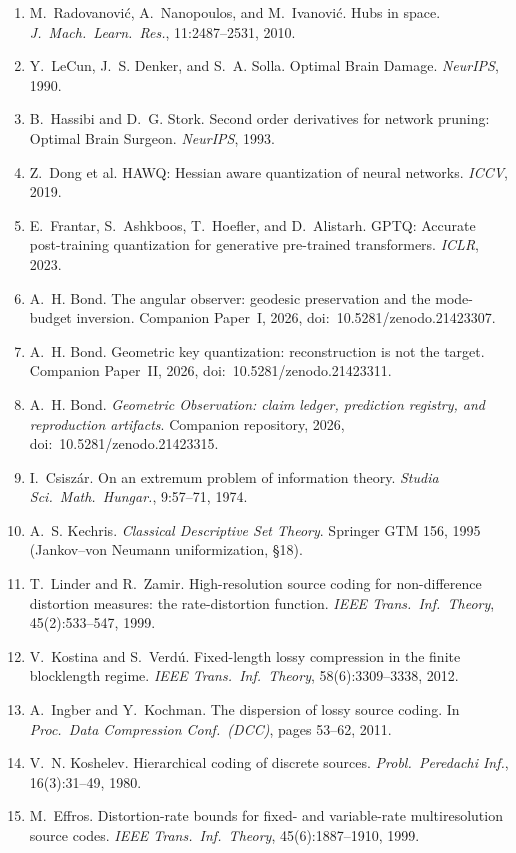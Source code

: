 \documentclass[lettersize,onecolumn]{IEEEtran}
\theoremstyle{definition}
\theoremstyle{remark}
\begin{document}
\begin{enumerate}
\item  M.~Radovanovi\'c, A.~Nanopoulos, and M.~Ivanovi\'c. Hubs in
space. \emph{J.\ Mach.\ Learn.\ Res.}, 11:2487--2531, 2010.
\item  Y.~LeCun, J.~S. Denker, and S.~A. Solla. Optimal Brain Damage.
\emph{NeurIPS}, 1990.
\item  B.~Hassibi and D.~G. Stork. Second order derivatives for
network pruning: Optimal Brain Surgeon. \emph{NeurIPS}, 1993.
\item  Z.~Dong et al. HAWQ: Hessian aware quantization of neural
networks. \emph{ICCV}, 2019.
\item  E.~Frantar, S.~Ashkboos, T.~Hoefler, and D.~Alistarh.
GPTQ: Accurate post-training quantization for generative pre-trained transformers.
\emph{ICLR}, 2023.
\item  A.~H. Bond. The angular observer: geodesic preservation and the
mode-budget inversion. Companion Paper~I, 2026, doi:~10.5281/zenodo.21423307.
\item  A.~H. Bond. Geometric key quantization: reconstruction is not the
target. Companion Paper~II, 2026, doi:~10.5281/zenodo.21423311.
\item  A.~H. Bond. \emph{Geometric Observation: claim ledger,
prediction registry, and reproduction artifacts}. Companion repository, 2026, doi:~10.5281/zenodo.21423315.
\item  I.~Csisz\'ar. On an extremum problem of information theory.
\emph{Studia Sci.\ Math.\ Hungar.}, 9:57--71, 1974.
\item  A.~S. Kechris. \emph{Classical Descriptive Set Theory}.
Springer GTM 156, 1995 (Jankov--von Neumann uniformization, \S18).
\item  T.~Linder and R.~Zamir. High-resolution source coding for
non-difference distortion measures: the rate-distortion function. \emph{IEEE Trans.\
Inf.\ Theory}, 45(2):533--547, 1999.
\item  V.~Kostina and S.~Verd\'u. Fixed-length lossy compression
in the finite blocklength regime. \emph{IEEE Trans.\ Inf.\ Theory},
58(6):3309--3338, 2012.
\item  A.~Ingber and Y.~Kochman. The dispersion of lossy source coding.
In \emph{Proc.\ Data Compression Conf.\ (DCC)}, pages 53--62, 2011.
\item  V.~N. Koshelev. Hierarchical coding of discrete sources.
\emph{Probl.\ Peredachi Inf.}, 16(3):31--49, 1980.
\item  M.~Effros. Distortion-rate bounds for fixed- and variable-rate
multiresolution source codes. \emph{IEEE Trans.\ Inf.\ Theory}, 45(6):1887--1910, 1999.

\end{enumerate}
\end{document}
